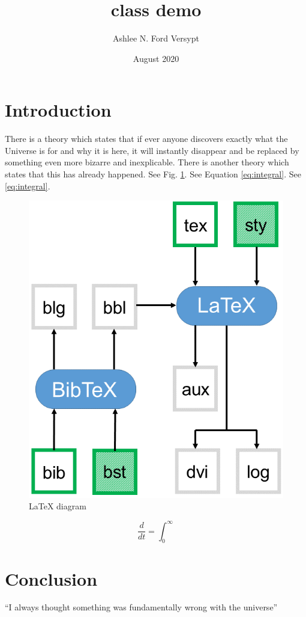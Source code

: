 \documentclass{article}
\title{class demo}
\author{Ashlee N. Ford Versypt}
\date{August 2020}
\begin{document}
\maketitle

\section{Introduction}
There is a theory which states that if ever anyone discovers exactly what the Universe is for and why it is here, it will instantly disappear and be replaced by something even more bizarre and inexplicable.
There is another theory which states that this has already happened. See Fig. \ref{fig:universe}. See Equation \ref{eq:integral}. See \eqref{eq:integral}.

\begin{figure}[h!]
\centering
\includegraphics[scale=0.5]{LaTeX_diagram}
\caption{LaTeX diagram}
\label{fig:universe}
\end{figure}

\begin{equation}
\frac{d}{dt}=\int_0^\infty
\label{eq:integral}
\end{equation}

\section{Conclusion}
``I always thought something was fundamentally wrong with the universe'' \cite{FordVersypt:2014}



\end{document}
